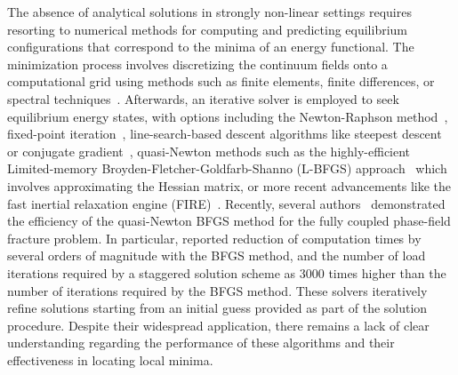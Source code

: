 The absence of analytical solutions in strongly non-linear settings requires resorting to numerical methods for computing and predicting equilibrium configurations that correspond to the minima of an energy functional. The minimization process involves discretizing the continuum fields onto a computational grid using methods such as finite elements, finite differences, or spectral techniques~\cite{Salman2009-qv,Liu2013-sj,Hu2021-mq}. Afterwards, an iterative solver is employed to seek equilibrium energy states, with options including the Newton-Raphson method~\cite{Wick2017-bo}, fixed-point iteration~\cite{Chen2019-mn,Kirkesaether_Brun2020-wa,Storvik2021-cd}, line-search-based descent algorithms like steepest descent or conjugate gradient~\cite{Stiefel1952-fw,Dai1999-hz}, quasi-Newton methods such as the highly-efficient Limited-memory Broyden-Fletcher-Goldfarb-Shanno (\textsc{L-BFGS}) approach~\cite{Liu1989-kl} which involves approximating the Hessian matrix, or more recent advancements like the fast inertial relaxation engine (\textsc{FIRE})~\cite{Guenole2020-tc}.
{
Recently, several authors~\cite{bharali:2022, najmeddine:2024, wu:2020} demonstrated the efficiency of the quasi-Newton BFGS
method for the fully coupled phase-field fracture problem. In particular, \cite{najmeddine:2024} reported reduction of computation
times by several orders of magnitude with the BFGS method, and the number of load iterations required by a staggered solution scheme as 3000 times higher than the number of iterations required by the BFGS method.
}
These solvers iteratively refine solutions starting from an initial guess provided as part of the solution procedure. Despite their widespread application, there remains a lack of clear understanding regarding the performance of these algorithms and their effectiveness in locating local minima.



